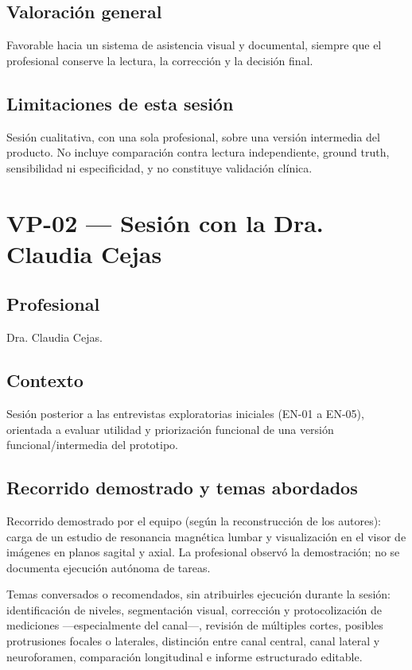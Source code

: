 \subsection*{Valoración general}
Favorable hacia un sistema de asistencia visual y documental, siempre que el profesional conserve la lectura, la corrección y la decisión final.

\subsection*{Limitaciones de esta sesión}
Sesión cualitativa, con una sola profesional, sobre una versión intermedia del producto. No incluye comparación contra lectura independiente, ground truth, sensibilidad ni especificidad, y no constituye validación clínica.

\section{VP-02 --- Sesión con la Dra. Claudia Cejas}
\label{anexo:h-vp02-cejas}

\subsection*{Profesional}
Dra. Claudia Cejas.

\subsection*{Contexto}
Sesión posterior a las entrevistas exploratorias iniciales (EN-01 a EN-05), orientada a evaluar utilidad y priorización funcional de una versión funcional/intermedia del prototipo.

\subsection*{Recorrido demostrado y temas abordados}
Recorrido demostrado por el equipo (según la reconstrucción de los autores): carga de un estudio de resonancia magnética lumbar y visualización en el visor de imágenes en planos sagital y axial. La profesional observó la demostración; no se documenta ejecución autónoma de tareas.

Temas conversados o recomendados, sin atribuirles ejecución durante la sesión: identificación de niveles, segmentación visual, corrección y protocolización de mediciones —especialmente del canal—, revisión de múltiples cortes, posibles protrusiones focales o laterales, distinción entre canal central, canal lateral y neuroforamen, comparación longitudinal e informe estructurado editable.

